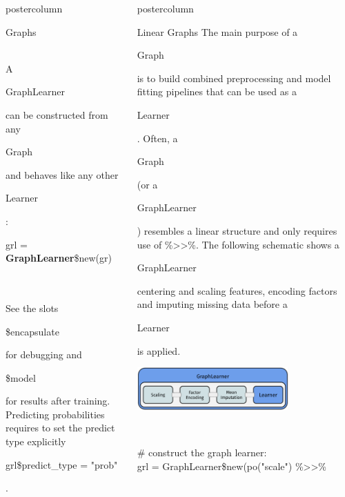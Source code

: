 \documentclass{beamer}
\newlength{\columnheight} %
\newcommand{\codeinline}[1]{\begin{codeboxinline}#1\end{codeboxinline}}
\begin{document}
\begin{frame}[fragile]{}
\begin{columns}
\begin{column}{.245\textwidth}
\begin{beamercolorbox}[center]{postercolumn}
\begin{minipage}{.98\textwidth}
{\begin{myblock}{Graphs}
\begin{itemize}
              \end{itemize}
              \ \\
              A \codeinline{GraphLearner} can be constructed from any \codeinline{Graph} and behaves like any other \codeinline{Learner}: \codeinline{grl = \textbf{GraphLearner}\$new(gr)}\\
              \ \\
              See the slots \codeinline{\$encapsulate} for debugging and \codeinline{\$model} for results after training. Predicting probabilities requires to set the predict type explicitly \codeinline{grl\$predict\_type = "prob"}.
						\end{myblock}
						\vfill}
				\end{minipage}
			\end{beamercolorbox}
		\end{column}
		\begin{column}{.245\textwidth}
			\begin{beamercolorbox}[center]{postercolumn}
				\begin{minipage}{.98\textwidth}
					\parbox[t][\columnheight]{\textwidth}{
            \begin{myblock}{Linear Graphs}
              The main purpose of a \codeinline{Graph} is to build combined preprocessing and model fitting pipelines that can be used as a \codeinline{Learner}. Often, a \codeinline{Graph} (or a \codeinline{GraphLearner}) resembles a linear structure and only requires use of \%>{}>\%. The following schematic shows a \codeinline{GraphLearner} centering and scaling features, encoding factors and imputing missing data before a \codeinline{Learner} is applied.
              \begin{center}
                \includegraphics[width=0.7\textwidth]{img/grl_linear.pdf}
              \end{center}
              \ \\
              \begin{codeboxexample}
                {\footnotesize
                  \# construct the graph learner:\\
                  grl = GraphLearner\$new(po("scale") \%>{}>\%\\
}
\end{codeboxexample}
\end{myblock}}
\end{minipage}
\end{beamercolorbox}
\end{column}
\end{columns}
\end{frame}
\end{document}

